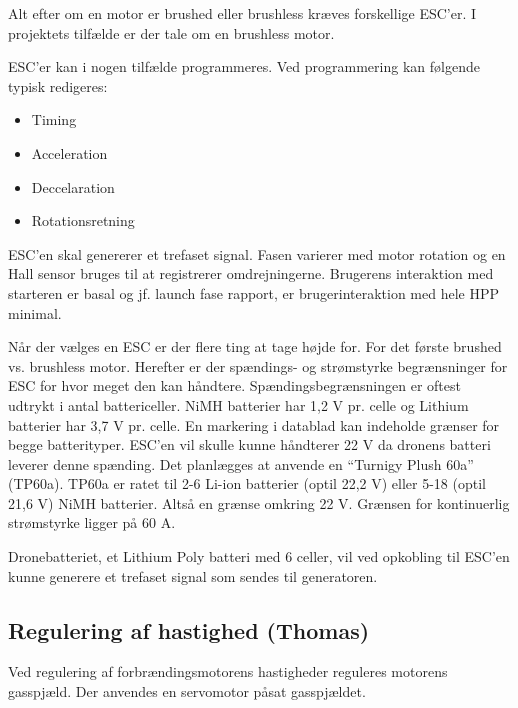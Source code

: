 Alt efter om en motor er brushed eller brushless kræves forskellige ESC'er. I projektets tilfælde er der tale om en brushless motor. 

ESC'er kan i nogen tilfælde programmeres. Ved programmering kan følgende typisk redigeres:
\begin{itemize}
\item Timing
\item Acceleration
\item Deccelaration
\item Rotationsretning
\end{itemize}

ESC'en skal genererer et trefaset signal. Fasen varierer med motor rotation og en Hall sensor bruges til at registrerer omdrejningerne. Brugerens interaktion med starteren er basal og jf. launch fase rapport, er brugerinteraktion med hele HPP minimal.

Når der vælges en ESC er der flere ting at tage højde for. For det første brushed vs. brushless motor. Herefter er der spændings- og strømstyrke begrænsninger for ESC for hvor meget den kan håndtere. Spændingsbegrænsningen er oftest udtrykt i antal battericeller. NiMH batterier har 1,2 V pr. celle og Lithium batterier har 3,7 V pr. celle. En markering i datablad kan indeholde grænser for begge batterityper. ESC'en vil skulle kunne håndterer 22 V da dronens batteri leverer denne spænding. Det planlægges at anvende  en ``Turnigy Plush 60a'' (TP60a). TP60a er ratet til 2-6 Li-ion batterier (optil 22,2 V) eller 5-18 (optil 21,6 V) NiMH batterier. Altså en grænse omkring 22 V. Grænsen for kontinuerlig strømstyrke ligger på 60 A.

Dronebatteriet, et Lithium Poly batteri med 6 celler, vil ved opkobling til ESC'en kunne generere et trefaset signal som sendes til generatoren.

\subsection{Regulering af hastighed (Thomas)}
\label{sec:regul-af-hast}

Ved regulering af forbrændingsmotorens hastigheder reguleres motorens gasspjæld. Der anvendes en servomotor påsat gasspjældet.

